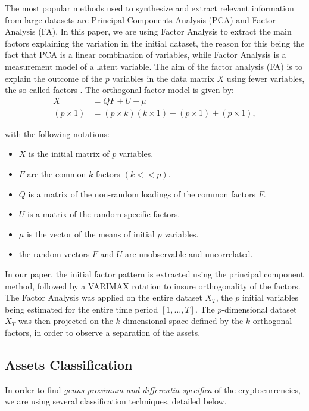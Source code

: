 The most popular methods used to synthesize and extract relevant information from large datasets are Principal Components Analysis (PCA) and Factor Analysis (FA)\citep{Bartholomew.2011}. In this paper, we are using Factor Analysis to extract the main factors explaining the variation in the initial dataset, the reason for this being the fact that PCA is a linear combination of variables, while Factor Analysis is a measurement model of a latent variable. The aim of the factor analysis (FA) is to explain the outcome of the $p$ variables in the data matrix $X$ using fewer variables, the so-called factors \citep{Hardle.2012}. The orthogonal factor model is given by:
\begin{align}
X&=QF+U+\mu\\
(p\times 1)&=(p\times k) (k\times 1) + (p\times 1)+(p\times 1),
\end{align}

with the following notations:
\begin{itemize}
  \item $X$ is the initial matrix of $p$ variables.
  \item $F$ are the common $k$ factors $(k<<p)$.
  \item $Q$ is a matrix of the non-random loadings of the common factors $F$.
  \item $U$ is a matrix of the random specific factors.
  \item $\mu$ is the vector of the means of initial $p$ variables.
  \item the random vectors $F$ and $U$ are unobservable and uncorrelated.
\end{itemize}

In our paper, the initial factor pattern is extracted using the principal component method, followed by a VARIMAX rotation to insure orthogonality of the factors. The Factor Analysis was applied on the entire dataset $X_T$, the $p$ initial variables being estimated for the entire time period $[1,\ldots, T]$. The $p$-dimensional dataset $X_T$ was then projected on the $k$-dimensional space defined by the $k$ orthogonal factors, in order to observe a separation of the assets.



\subsection{Assets Classification}
In order to find \textit{genus proximum and differentia specifica} of the cryptocurrencies, we are using several classification techniques, detailed below.
